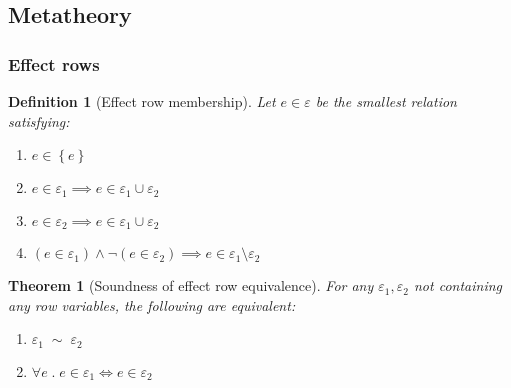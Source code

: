 \documentclass[12pt]{article}
\newtheorem{definition}{Definition}
\newtheorem{theorem}{Theorem}
\newcommand\parens[1]{\left( #1 \right)}
\newcommand\row{\varepsilon}
\newcommand\rsingleton[1]{\left\{ #1 \right\}}
\newcommand\runion[2]{#1 \cup #2}
\newcommand\rdiff[2]{#1 \setminus #2}
\newcommand\effect{e}
\newcommand\requiv[2]{#1 \; \sim \; #2}
\begin{document}
    \subsection{Metatheory}

      \subsubsection{Effect rows}

        \begin{definition}[Effect row membership]
          Let $\effect \in \row$ be the smallest relation satisfying:
          \begin{enumerate}
            \item $\effect \in \rsingleton{\effect}$
            \item $\effect \in \row_1 \implies \effect \in \runion{\row_1}{\row_2}$
            \item $\effect \in \row_2 \implies \effect \in \runion{\row_1}{\row_2}$
            \item $\parens{\effect \in \row_1} \wedge \neg \parens{\effect \in \row_2} \implies \effect \in \rdiff{\row_1}{\row_2}$
          \end{enumerate}
        \end{definition}

        \begin{theorem}[Soundness of effect row equivalence]
          For any $\row_1, \row_2$ not containing any row variables, the following are equivalent:
          \begin{enumerate}
            \item $\requiv{\row_1}{\row_2}$
            \item $\forall \effect \;.\; \effect \in \row_1 \iff \effect \in \row_2$
          \end{enumerate}
        \end{theorem}
\end{document}
